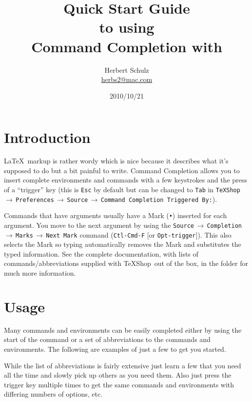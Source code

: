 \documentclass[11pt]{article}
\title{Quick Start Guide\\ to using\\ Command Completion with \TS}
\author{Herbert Schulz\\\small\href{mailto:herbs2@mac.com}{herbs2@mac.com}}
\date{2010/10/21}
\newcommand{\mnu}[1]{\texttt{#1}}
\newcommand{\cmd}[1]{\texttt{#1}}
\newcommand{\To}{\,\(\to\)\,}
\newcommand{\TS}{\textsf{\TeX Shop}}
\begin{document}
\maketitle
\thispagestyle{empty}

\section*{Introduction}


\LaTeX\ markup is rather wordy which is nice because it describes what it's supposed to do but a bit painful to write. Command Completion allows you to insert complete environments and commands with a few keystrokes and the press of a ``trigger'' key (this is \cmd{Esc} by default but can be changed to \cmd{Tab} in \mnu{TeXShop}\To\mnu{Preferences}\To\mnu{Source}\To\mnu{Command Completion Triggered By:}).

Commands that have arguments usually have a Mark (\texttt{•}) inserted for each argument. You move to the next argument by using the \mnu{Source}\To\mnu{Completion}\To\mnu{Marks}\To\mnu{Next Mark} command (\cmd{Ctl-Cmd-F} [or \cmd{Opt-trigger}]). This also selects the Mark so typing automatically removes the Mark and substitutes the typed information. See the complete documentation, with lists of commands/abbreviations supplied with \TS\ out of the box, in the  folder for much more information.

\section*{Usage}

Many commands and environments can be easily completed either by using the start of the command or a set of abbreviations to the commands and environments. The following are examples of just a few to get you started.

While the list of abbreviations is fairly extensive just learn a few that you need all the time and slowly pick up others as you need them. Also just press the trigger key multiple times to get the same commands and environments with differing numbers of options, etc.
\end{document}

